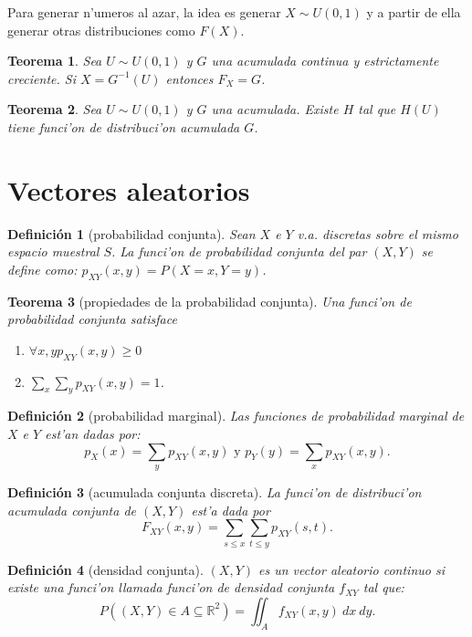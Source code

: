 \documentclass[a4paper,spanish]{article}
\newcommand{\R}[0]{\mathbb{R}}
\newtheorem{teo}{Teorema}
\newtheorem{defi}{Definici\'on}
\begin{document}
Para generar n'umeros al azar, la idea es generar $X \sim U(0,1)$ y a partir 
de ella generar otras distribuciones como $F(X)$.

\begin{teo}Sea $U \sim U(0,1)$ y $G$ una acumulada continua y estrictamente
creciente. Si $X = G^{-1}(U)$ entonces $F_X = G$.
\end{teo}

\begin{teo} Sea $U \sim U(0,1)$ y $G$ una acumulada. Existe $H$ tal que 
$H(U)$ tiene funci'on de distribuci'on acumulada $G$.
\end{teo}

\section{Vectores aleatorios}

\newcommand{\pxy}[0]{p_{XY}}
\newcommand{\fxy}[0]{f_{XY}}
\newcommand{\Fxy}[0]{F_{XY}}

\begin{defi}[probabilidad conjunta]
Sean $X$ e $Y$ v.a. discretas sobre el mismo espacio muestral $S$. La 
\emph{funci'on de probabilidad conjunta} del par $(X,Y)$ se define como:
$\pxy(x,y) = P(X = x, Y = y)$.
\end{defi}

\begin{teo}[propiedades de la probabilidad conjunta]
Una funci'on de probabilidad conjunta satisface
\begin{enumerate}
\item $\forall x,y \pxy(x,y) \geq 0$
\item $\sum_x \sum_y \pxy(x,y) = 1$.
\end{enumerate}
\end{teo}

\begin{defi}[probabilidad marginal]
Las \emph{funciones de probabilidad marginal} de $X$ e $Y$ est'an dadas por:
$$p_X(x) = \sum_y \pxy(x,y) \mbox{\ \ y\ \ } p_Y(y) = \sum_x \pxy(x,y).$$
\end{defi}

\begin{defi}[acumulada conjunta discreta] La \emph{funci'on de distribuci'on
acumulada conjunta} de $(X,Y)$ est'a dada por
$$\Fxy(x,y) = \sum_{s \leq x} \sum_{t \leq y} \pxy(s,t).$$
\end{defi}

\begin{defi}[densidad conjunta] $(X,Y)$ es un vector aleatorio continuo
si existe una funci'on llamada \emph{funci'on de densidad conjunta} $\fxy$ tal
que:
$$P((X,Y) \in A \subseteq \R^2) = \iint_A \fxy(x,y)\ dx\ dy.$$
\end{defi}
\end{document}
